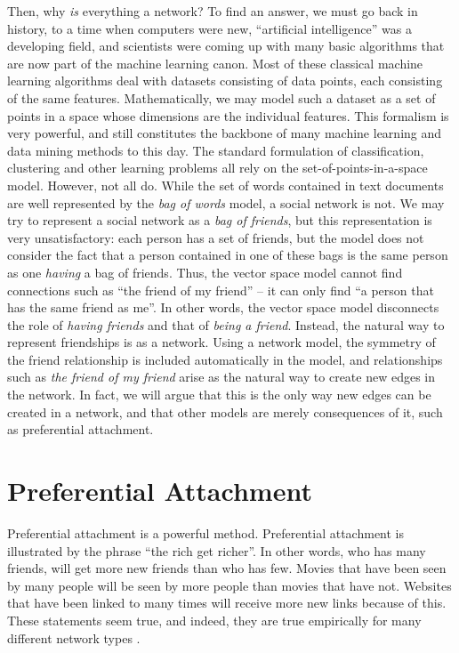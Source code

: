 \documentclass{acm_proc_article-sp}
\begin{document}
Then, why \emph{is} everything a network?  To find an answer, we must
go back in history, to a time when computers were new, ``artificial
intelligence'' was a developing field, and scientists were coming up with
many basic algorithms that are now part of the machine
learning canon.  Most of these classical machine learning algorithms deal with
datasets consisting of data points, each consisting of the same
features.  Mathematically, we may model such a dataset as a set of
points in a space whose dimensions are the individual features.  This
formalism is very powerful, and still constitutes the backbone of many
machine learning and data mining methods to this day.  The standard
formulation of classification, clustering and other learning problems
all rely on the set-of-points-in-a-space model. However, not all do.
While the set of words contained in text documents are well represented
by the \emph{bag of words} model, a social network is not.  We may try to
represent a social network as a \emph{bag of friends}, but this
representation is very unsatisfactory:  each person has a set of
friends, but the model does not consider the fact that a person
contained in one of these bags is the same person as one
\emph{having} a bag of friends.  Thus, the vector space model cannot
find connections such as ``the friend of my friend'' -- it can only find
``a person that has the same friend as me''.  In other words, the vector
space model disconnects the role of \emph{having friends} and that of
\emph{being a friend}.  Instead, the natural way to represent
friendships is as a network.  Using a network model, the symmetry of the
friend relationship is included automatically in the model, and
relationships such as \emph{the friend of my friend} arise as the
natural way to create new edges in the network.  In fact, we will argue
that this is the only way new edges can be created in a network, and
that other models are merely consequences of it, such as preferential
attachment. 

\section{Preferential Attachment}
Preferential attachment is a powerful method.  Preferential attachment
is illustrated by the phrase ``the rich get richer''.  In other words,
who has many friends, will get more new friends than who has few.  Movies
that have been seen by many people will be seen by more people than
movies that have not.  Websites that have been linked to many times will
receive more new links because of this.  These statements seem true, and
indeed, they are true empirically for many different network types
\cite{kunegis:preferential-attachment}. 
\end{document}
